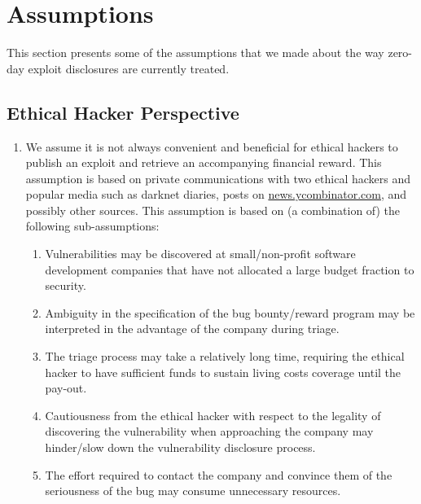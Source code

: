 \section{Assumptions}\label{sec:assumptions}
This section presents some of the assumptions that we made about the way zero-day exploit disclosures are currently treated.

\subsection{Ethical Hacker Perspective}
\begin{enumerate}
	\item We assume it is not always convenient and beneficial for ethical hackers to publish an exploit and retrieve an accompanying financial reward. This assumption is based on private communications with two ethical hackers %
	and popular media such as darknet diaries, posts on \url{news.ycombinator.com},  and possibly other sources. %
	This assumption is based on (a combination of) the following sub-assumptions:
	\begin{enumerate}
		\item Vulnerabilities may be discovered at small/non-profit software development companies that have not allocated a large budget fraction to security.
		\item Ambiguity in the specification of the bug bounty/reward program may be interpreted in the advantage of the company during triage.
		\item The triage process may take a relatively long time, requiring the ethical hacker to have sufficient funds to sustain living costs coverage until the pay-out.
		\item Cautiousness from the ethical hacker with respect to the legality of discovering the vulnerability when approaching the company  may hinder/slow down the vulnerability disclosure process.
		\item The effort required to contact the company and convince them of the seriousness of the bug may consume unnecessary resources.
	\end{enumerate}
\end{enumerate}

